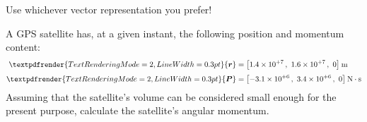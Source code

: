 \documentclass[a4paper,12pt,%
onecolumn,oneside,titlepage,%
british%
]{memoir}
\renewcommand*{\bm}[1]{\textpdfrender{TextRenderingMode=2,LineWidth=0.3pt}{\boldsymbol{#1}}}
\renewcommand*{\|}[1][]{\nonscript\:#1\vert\nonscript\:\mathopen{}}
\newcommand*{\yr}{\bm{r}}
\newcommand*{\yP}{\bm{P}}
\begin{document}
Use whichever vector representation you prefer! %

\begin{exercise}
  A GPS satellite has, at a given instant, the following position and momentum content:
  \begin{equation*}
    \begin{split}
      \yr &=\bigl[
      \num[exponent-mode=scientific]{1.4e+7}\,,\ 
      \num[exponent-mode=scientific]{1.6e+7}\,,\ 
      0\bigr]\:\unit{m}
      \\[\jot]
      \yP &=\bigl[
      \num[exponent-mode=scientific]{-3.1e+6}\,,\ 
      \num[exponent-mode=scientific]{3.4e+6}\,,\ 
      0\bigr]\:\unit{N\cdot s}
    \end{split}
  \end{equation*}
  Assuming that the satellite's volume can be considered small enough for the present purpose, calculate the satellite's angular momentum.
\end{exercise}


\bigskip
\end{document}
